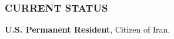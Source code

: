 \documentclass[10pt,letter]{article}
\begin{document}
\begin{small}
\subsubsection*{CURRENT STATUS}
\begin{list}{}{}
\item \textbf{U.S. Permanent Resident}, Citizen of Iran.
\end{list}

%

%
%


\end{small}
\end{document}
